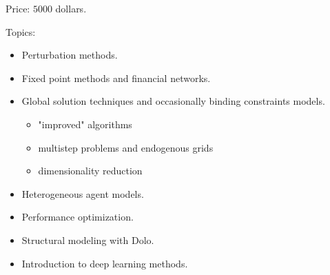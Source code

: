 \documentclass[12pt]{article}
\begin{document}
Price: $5000$ dollars.

Topics:
%
\begin{itemize}
    \item Perturbation methods.
    \item Fixed point methods and financial networks.
    \item Global solution techniques and occasionally binding constraints models.
    \begin{itemize}
        \item "improved" algorithms
        \item multistep problems and endogenous grids
        \item dimensionality reduction
    \end{itemize}
    \item Heterogeneous agent models.
    \item Performance optimization.
    \item Structural modeling with Dolo.
    \item Introduction to deep learning methods.
\end{itemize}
\end{document}
